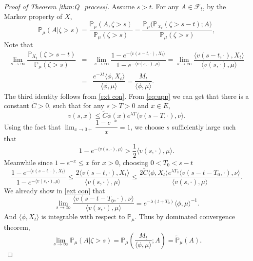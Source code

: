 \documentclass[12pt,a4paper]{amsart}
\numberwithin{equation}{section}
\theoremstyle{plain}
\theoremstyle{definition}
\begin{document}
\begin{proof}[Proof of Theorem \ref{thm:Q_process}]
  Assume $s>t$.  For any $A\in\mathscr F_t$, by the Markov property of $X$,
  \[
    \mathbb P_\mu(A|\zeta>s)=\dfrac{\mathbb P_\mu(A, \zeta>s)}{\mathbb P_\mu(\zeta>s)}=\dfrac{\mathbb P_\mu\big(\mathbb P_{X_t}(\zeta>s-t);A\big)}{\mathbb P_\mu(\zeta>s)},
  \]
  Note that
  \begin{eqnarray*}
    \lim_{s\rightarrow\infty}\dfrac{\mathbb P_{X_t}(\zeta>s-t)}{\mathbb P_\mu(\zeta>s)}
    &=&\lim_{s\rightarrow\infty}\dfrac{1-e^{-\langle v(s-t,\cdot),X_t\rangle }}{1-e^{-\langle v(s,\cdot),\mu\rangle }}
        =\lim_{s\rightarrow\infty}\dfrac{\langle v(s-t,\cdot),X_t\rangle }{\langle v(s,\cdot),\mu\rangle }\\
    &=& \dfrac{e^{-\lambda t}\langle \phi, X_t\rangle }{\langle \phi,\mu\rangle }=\dfrac{M_t}{\langle \phi,\mu\rangle }.
  \end{eqnarray*}
  The third identity follows from \eqref{ext con}.  From \eqref{eq:upp} we can get that there is a constant $\widetilde C>0$, such that for any $s>T>0$ and $x\in E$,
  \[
    v(s,x)\leq \widetilde C\phi(x)e^{\lambda T}\langle v(s-T,\cdot),\nu\rangle .
  \]
  Using the fact that $\lim_{x\rightarrow 0+}\dfrac{1-e^{-x}}{x}=1$, we choose $s$ sufficiently large such that
  \[
    1-e^{-\langle v(s,\cdot),\mu\rangle }>\frac{1}{2}\langle v(s,\cdot),\mu\rangle .
  \]
  Meanwhile since $1-e^{-x}\leq x$ for $x>0$, choosing $0<T_0<s-t$
  \[
    \dfrac{1-e^{-\langle v(s-t,\cdot),X_t\rangle }}{1-e^{-\langle v(s,\cdot),\mu\rangle }}
    \leq \dfrac{2\langle v(s-t,\cdot),X_t\rangle }{\langle v(s,\cdot),\mu\rangle }\leq \dfrac{2\widetilde C\langle \phi,X_t\rangle e^{\lambda T_0}\langle v(s-t-T_0,\cdot),\nu\rangle }{\langle v(s,\cdot),\mu\rangle }.
  \]
  We already show in \eqref{ext con} that
  \[
    \lim_{s\rightarrow\infty}\dfrac{\langle v(s-t-T_0,\cdot),\nu\rangle }{\langle v(s,\cdot),\mu\rangle }
    =e^{-\lambda(t+T_0)}\langle \phi,\mu\rangle ^{-1}.
  \]
  And $\langle \phi,X_t\rangle $ is integrable with respect to $\mathbb P_\mu$.  Thus by dominated convergence theorem,
  \[
    \lim_{s\rightarrow\infty}\mathbb P_\mu(A|\zeta>s)=\mathbb P_\mu\left(\frac{M_t}{\langle\phi,\mu\rangle };A\right)=\widetilde{\mathbb P}_\mu(A).
  \]
\end{proof}
\end{document}
